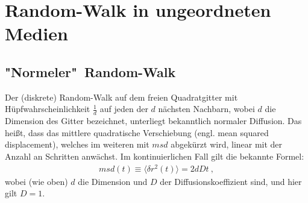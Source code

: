 \documentclass[a4paper, 12pt]{scrartcl}
\begin{document}
\clearpage

\section{Random-Walk in ungeordneten Medien}

\subsection{"Normeler"\ Random-Walk}
Der (diskrete) Random-Walk auf dem freien Quadratgitter mit Hüpfwahrscheinlichkeit $\frac{1}{d}$ auf jeden der $d$ nächsten Nachbarn, wobei $d$ die Dimension des Gitter bezeichnet, unterliegt bekanntlich normaler Diffusion. Das heißt, dass das mittlere quadratische Verschiebung (engl. mean squared displacement), welches im weiteren mit $msd$ abgekürzt wird, linear mit der Anzahl an Schritten anwächst. Im kontinuierlichen Fall gilt die bekannte Formel:
\begin{align*}
msd(t)\equiv \langle \delta r^2 (t) \rangle =2dDt\ ,
\end{align*}
wobei (wie oben) $d$ die Dimension und $D$ der Diffusionskoeffizient sind, und hier gilt $D=1$.
\end{document}
